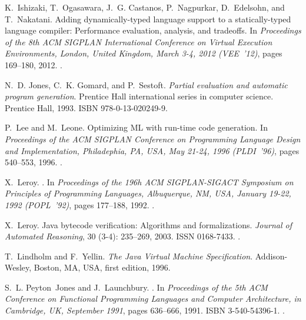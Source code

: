 \documentclass[preprint,10pt]{popl14conf}
\begin{document}
\begin{thebibliography}{46}
K.~Ishizaki, T.~Ogasawara, J.~G. Castanos, P.~Nagpurkar, D.~Edelsohn, and
  T.~Nakatani.
\newblock Adding dynamically-typed language support to a statically-typed
  language compiler: Performance evaluation, analysis, and tradeoffs.
\newblock In \emph{Proceedings of the 8th {ACM SIGPLAN International Conference
  on Virtual Execution Environments}, London, United Kingdom, March 3-4, 2012
  (VEE~'12)}, pages 169--180, 2012.
\newblock {}.

N.~D. Jones, C.~K. Gomard, and P.~Sestoft.
\newblock \emph{Partial evaluation and automatic program generation}.
\newblock Prentice Hall international series in computer science. Prentice
  Hall, 1993.
\newblock ISBN 978-0-13-020249-9.

P.~Lee and M.~Leone.
\newblock Optimizing {ML} with run-time code generation.
\newblock In \emph{Proceedings of the {ACM SIGPLAN Conference on Programming
  Language Design and Implementation}, Philadephia, PA, USA, May 21-24, 1996
  (PLDI~'96)}, pages 540--553, 1996.
\newblock {}.

X.~Leroy.
.
\newblock In \emph{Proceedings of the 196h {ACM SIGPLAN-SIGACT Symposium on
  Principles of Programming Languages}, Albuquerque, NM, USA, January 19-22,
  1992 (POPL~'92)}, pages 177--188, 1992.
\newblock {}.

X.~Leroy.
\newblock Java bytecode verification: Algorithms and formalizations.
\newblock \emph{Journal of Automated Reasoning}, 30 (3-4):
  235--269, 2003.
\newblock ISSN 0168-7433.
\newblock {}.

T.~Lindholm and F.~Yellin.
\newblock \emph{The Java Virtual Machine Specification}.
\newblock Addison-Wesley, Boston, MA, USA, first edition, 1996.

S.~L. Peyton~Jones and J.~Launchbury.
.
\newblock In \emph{Proceedings of the 5th ACM Conference on Functional
  Programming Languages and Computer Architecture, in Cambridge, UK, September
  1991}, pages 636--666, 1991.
\newblock ISBN 3-540-54396-1.
\newblock {}.


\end{thebibliography}
\end{document}

